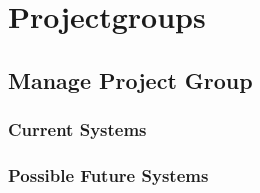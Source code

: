 \section{Projectgroups}
\subsection{Manage Project Group}
\subsubsection{Current Systems}
\subsubsection{Possible Future Systems}





\begin{comment}
\todo{Undersøgelse af: "`Hvem skal oprette projektgrupperne"' }
\todo{Kom frem til at vi skal interview administrativt personale for at finde ud af hvordan grupper bliver brugt i praksis}
\subsection{Interviews}
\todo{Fortæl om følgende interviews
-Thomas Rybjerg
-Lene Even
-Jette og Pia
-Morten Andersen
-Mikael Møller} 
\end{comment}
